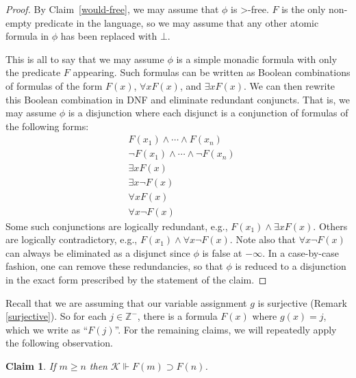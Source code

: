 \documentclass[12pt]{article}
\newtheorem{claim}{Claim}
\newcommand{\would}{\mathbin{>}}
\newcommand{\then}{\mathbin{\supset}}
\begin{document}
\begin{proof}
    By Claim~\ref{would-free}, we may assume that $\phi$ is $\would$-free. 
    $F$ is the only non-empty predicate in the language, so we may assume that any other atomic formula in $\phi$ has been replaced with $\bot$. 
    
    This is all to say that we may assume $\phi$ is a simple monadic formula with only the predicate $F$ appearing. 
    Such formulas can be written as Boolean combinations of formulas of the form $F(x)$, $\forall x F(x)$, and $\exists x F(x)$. 
    We can then rewrite this Boolean combination in DNF and eliminate redundant conjuncts. 
    That is, we may assume $\phi$ is a disjunction where each disjunct is a conjunction of formulas of the following forms:
    \begin{align*}
        & F(x_1) \wedge \cdots \wedge F(x_n)\\
        & \neg F(x_1) \wedge \cdots \wedge \neg F(x_n)\\
        & \exists x F(x) \\
        & \exists x \neg F(x) \\
        & \forall x F(x) \\
        & \forall x \neg F(x)
    \end{align*}
    Some such conjunctions are logically redundant, e.g., $F(x_1)\wedge \exists x F(x)$. 
    Others are logically contradictory, e.g., $F(x_1)\wedge \forall x \neg F(x)$. 
    Note also that $\forall x \neg F(x)$ can always be eliminated as a disjunct since $\phi$ is false at $-\infty$. 
    In a case-by-case fashion, one can remove these redundancies, so that $\phi$ is reduced to a disjunction in the exact form prescribed by the statement of the claim.
\end{proof}

Recall that we are assuming that our variable assignment $g$ is surjective (Remark \ref{surjective}). 
So for each $j\in\mathbb{Z}^-$, there is a formula $F(x)$ where $g(x) = j$, which we write as ``$F(j)$''. For the remaining claims, we will repeatedly apply the following observation.

\begin{claim}\label{observation}
    If $m\geq n$ then $\mathcal{K} \Vdash F(m)\then F(n)$.
\end{claim}
\end{document}
